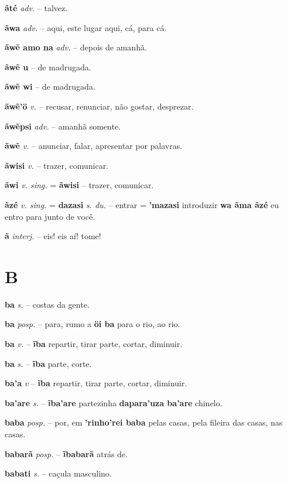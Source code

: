 \textbf{ãté} \textit{adv.} -- talvez.

\textbf{ãwa} \textit{adv.} -- aqui, este lugar aqui, cá, para cá.

\textbf{ãwẽ amo na} \textit{adv.} -- depois de amanhã.

\textbf{ãwẽ u} -- de madrugada.

\textbf{ãwẽ wi} -- de madrugada.

\textbf{ãwẽ'ö} \textit{v.} -- recusar, renunciar, não gostar, desprezar.

\textbf{ãwẽpsi} \textit{adv.} -- amanhã somente.

\textbf{ãwẽ} \textit{v.} -- anunciar, falar, apresentar por palavras.

\textbf{ãwisi} \textit{v.} -- trazer, comunicar.

\textbf{ãwi} \textit{v. sing.} = \textbf{ãwisi} -- trazer, comunicar.

\textbf{ãzé} \textit{v. sing.} = \textbf{dazasi} \textit{s. du.} -- entrar  = \textbf{'mazasi} introduzir  \textbf{wa ãma ãzé} eu entro para junto de você.

\textbf{ã} \textit{interj.} -- eis! eis aí! tome!





\section*{B}


\textbf{ba} \textit{s.} -- costas da gente.

\textbf{ba} \textit{posp.} -- para, rumo a  \textbf{öi ba} para o rio, ao rio.

\textbf{ba} \textit{v.} -- \textbf{ĩba} repartir, tirar parte, cortar, diminuir.

\textbf{ba} \textit{s.} -- \textbf{ĩba} parte, corte.

\textbf{ba'a} \textit{v} -- \textbf{ĩba} repartir, tirar parte, cortar, diminuir.

\textbf{ba'are} \textit{s.} -- \textbf{ĩba'are} partezinha  \textbf{dapara'uza ba'are} chinelo.

\textbf{baba} \textit{posp.} -- por, em  \textbf{'rinho'rei baba} pelas casas, pela fileira das casas, nas casas.

\textbf{babarã} \textit{posp.} -- \textbf{ĩbabarã} atrás de.

\textbf{babati} \textit{s.} -- caçula masculino.

